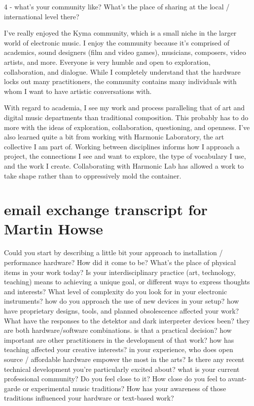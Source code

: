 4 - what's your community like? What's the place of sharing at the local / international level there? 

I've really enjoyed the Kyma community, which is a small niche in the larger world of electronic music. I enjoy the community because it's comprised of academics, sound designers (film and video games), musicians, composers, video artists, and more. Everyone is very humble and open to exploration, collaboration, and dialogue.  While I completely understand that the hardware locks out many practitioners, the community contains many individuals with whom I want to have artistic conversations with.

With regard to academia, I see my work and process paralleling that of art and digital music departments than traditional composition. This probably has to do more with the ideas of exploration, collaboration, questioning, and openness. I've also learned quite a bit from working with Harmonic Laboratory, the art collective I am part of. Working between disciplines informs how I approach a project, the connections I see and want to explore, the type of vocabulary I use, and the work I create. Collaborating with Harmonic Lab has allowed a work to take shape rather than to oppressively mold the container.

\section{email exchange transcript for Martin Howse}

Could you start by describing a little bit your approach to installation / performance hardware? How did it come to be? What's the place of physical items in your work today?  
Is your interdisciplinary practice (art, technology, teaching) means to achieving a unique goal, or different ways to express thoughts and interests?  
What level of complexity do you look for in your electronic instruments? 
how do you approach the use of new devices in your setup? 
how have proprietary designs, tools, and planned obsolescence affected your work? 
What have the responses to the detektor and dark interpreter devices been? 
they are both hardware/software combinations. is that a practical decision? 
how important are other practitioners in the development of that work? 
how has teaching affected your creative interests? 
in your experience, who does open source / affordable hardware empower the most in the arts? 
Is there any recent technical development you're particularly excited about? 
what is your current professional community? Do you feel close to it? 
How close do you feel to avant-garde or experimental music traditions? 
How has your awareness of those traditions influenced your hardware or text-based work?

